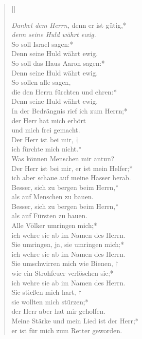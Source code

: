 \def\greinitialformat#1{{\fontsize{40}{40}\selectfont #1}}
\gresetfirstlineaboveinitial{\small \textcolor{red}{ Ps 118 a}}{}
\setaboveinitialseparation{0.72mm}


\medskip


\begin{verse}[\versewidth]
 

{\it{Danket dem Herrn,}} denn er ist gütig,*\\
{\it{denn seine Huld währt ewig.}}\\
\vin So soll Israel sagen:*\\
\vin Denn seine Huld währt ewig.\\
So soll das Haus Aaron sagen:*\\
Denn seine Huld währt ewig.\\
\vin So sollen alle sagen,\\
\vin die den Herrn fürchten und ehren:*\\
\vin Denn seine Huld währt ewig.\\
In der Bedrängnis rief ich zum Herrn;*\\ 
der Herr hat mich erhört\\
und mich frei gemacht.\\
\vin Der Herr ist bei mir, †\\
\vin ich fürchte mich nicht.*\\
\vin Was können Menschen mir antun?\\
Der Herr ist bei mir, er ist mein Helfer;*\\
ich aber schaue auf meine Hasser herab.\\
\vin Besser, sich zu bergen beim Herrn,*\\
\vin als auf Menschen zu bauen.\\
Besser, sich zu bergen beim Herrn,*\\
als auf Fürsten zu bauen.\\
\vin Alle Völker umringen mich;*\\
\vin ich wehre sie ab im Namen des Herrn.\\
Sie umringen, ja, sie umringen mich;*\\
ich wehre sie ab im Namen des Herrn.\\
\vin Sie umschwirren mich wie Bienen, †\\
\vin wie ein Strohfeuer verlöschen sie;*\\
\vin ich wehre sie ab im Namen des Herrn.\\
Sie stießen mich hart, †\\
sie wollten mich stürzen;*\\
der Herr aber hat mir geholfen.\\
\vin Meine Stärke und mein Lied ist der Herr;*\\
\vin er ist für mich zum Retter geworden.\\

\end{verse}

